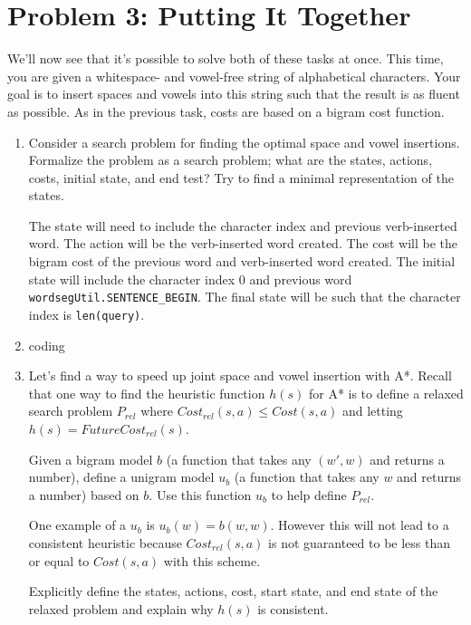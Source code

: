 \documentclass[10pt]{article}
\begin{document}
\section*{\normalsize Problem 3: Putting It Together}

We'll now see that it's possible to solve both of these tasks at once. This time, you are given a whitespace- and vowel-free string of alphabetical characters. Your goal is to insert spaces and vowels into this string such that the result is as fluent as possible. As in the previous task, costs are based on a bigram cost function.

\begin{enumerate}[label=(\alph*)]

  \item Consider a search problem for finding the optimal space and vowel insertions. Formalize the problem as a search problem; what are the states, actions, costs, initial state, and end test? Try to find a minimal representation of the states.
  
  The state will need to include the character index and previous verb-inserted word. The action will be the verb-inserted word created. The cost will be the bigram cost of the previous word and verb-inserted word created. The initial state will include the character index 0 and previous word \texttt{wordsegUtil.SENTENCE\_BEGIN}. The final state will be such that the character index is \texttt{len(query)}.
  
  \item coding
  
  \item  Let's find a way to speed up joint space and vowel insertion with A*. Recall that one way to find the heuristic function $h(s)$ for A* is to define a relaxed search problem $P_{rel}$ where $Cost_{rel}(s,a) \leq Cost(s,a)$ and letting $h(s)=FutureCost_{rel}(s)$.

Given a bigram model $b$ (a function that takes any $(w',w)$ and returns a number), define a unigram model $u_b$ (a function that takes any $w$ and returns a number) based on $b$. Use this function $u_b$ to help define $P_{rel}$.

One example of a $u_b$ is $u_b(w)=b(w,w)$. However this will not lead to a consistent heuristic because $Cost_{rel}(s,a)$ is not guaranteed to be less than or equal to $Cost(s,a)$ with this scheme.

Explicitly define the states, actions, cost, start state, and end state of the relaxed problem and explain why $h(s)$ is consistent.


\end{enumerate}
\end{document}
